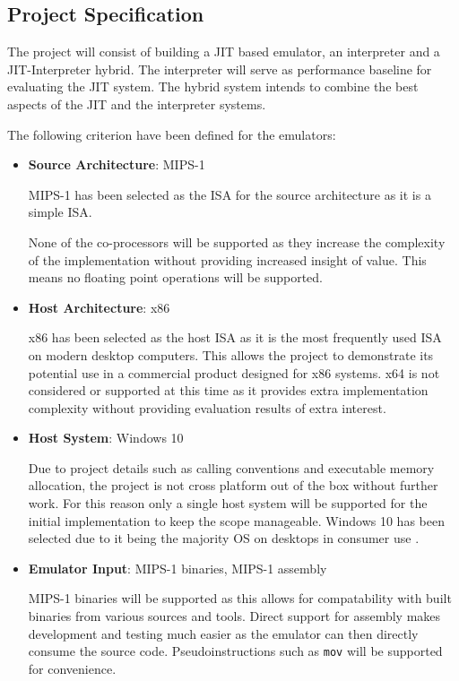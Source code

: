 \subsection{Project Specification}

The project will consist of building a JIT based emulator, an interpreter and a JIT-Interpreter hybrid. The interpreter will serve as performance baseline for evaluating the JIT system. The hybrid system intends to combine the best aspects of the JIT and the interpreter systems.

The following criterion have been defined for the emulators:

\begin{itemize}
    \item \textbf{Source Architecture}: MIPS-1
    
    MIPS-1 has been selected as the ISA for the source architecture as it is a simple ISA. 

    None of the co-processors will be supported as they increase the complexity of the implementation without providing increased insight of value. This means no floating point operations will be supported.
    
    \item \textbf{Host Architecture}: x86
    
    x86 has been selected as the host ISA as it is the most frequently used ISA on modern desktop computers. This allows the project to demonstrate its potential use in a commercial product designed for x86 systems. x64 is not considered or supported at this time as it provides extra implementation complexity without providing evaluation results of extra interest.
    
    \item \textbf{Host System}: Windows 10
    
    Due to project details such as calling conventions and executable memory allocation, the project is not cross platform out of the box without further work. For this reason only a single host system will be supported for the initial implementation to keep the scope manageable. Windows 10 has been selected due to it being the majority OS on desktops in consumer use \cite{desktop-os-share, win-os-share}.
    
    \item \textbf{Emulator Input}: MIPS-1 binaries, MIPS-1 assembly
    
    MIPS-1 binaries will be supported as this allows for compatability with built binaries from various sources and tools. Direct support for assembly makes development and testing much easier as the emulator can then directly consume the source code. Pseudoinstructions such as \texttt{mov} will be supported for convenience.


\end{itemize}
